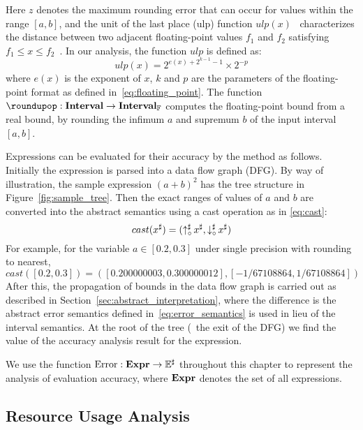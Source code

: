 Here $z$ denotes the maximum rounding error that can occur for values
within the range $[a, b]$, and the unit of the last place (ulp) function
$ulp(x)$~\cite{muller} characterizes the distance between two adjacent
floating-point values $f_1$ and $f_2$ satisfying $f_1 \leq x \leq
f_2$~\cite{goldberg}. In our analysis, the function $ulp$ is defined as:
\begin{equation}
    ulp(x) = 2^{e(x) + 2^{k - 1} - 1} \times 2^{-p}
\end{equation}
where $e(x)$ is the exponent of $x$, $k$ and $p$ are the parameters of the
floating-point format as defined in~\eqref{eq:floating_point}. The function
$\roundupop: \intervalset \to \floatintervalset$ computes the floating-point
bound from a real bound, by rounding the infimum $a$ and supremum $b$ of the
input interval $[a, b]$.

Expressions can be evaluated for their accuracy by the method as follows.
Initially the expression is parsed into a data flow graph (DFG). By way of
illustration, the sample expression ${(a + b)}^2$ has the tree structure
in Figure~\ref{fig:sample_tree}. Then the exact ranges of values of $a$ and
$b$ are converted into the abstract semantics using a cast operation as in
\eqref{eq:cast}:
\begin{equation}
    cast(x^\sharp) = (\operatorname{\uparrow^\sharp_\circ}{x^\sharp}, \operatorname{\downarrow^\sharp_\circ}{x^\sharp})
    \label{eq:cast}
\end{equation}
For example, for the variable $a \in [0.2, 0.3]$ under single precision
with rounding to nearest,
\begin{equation}
    cast([0.2, 0.3]) = ([0.200000003, 0.300000012], [-1/67108864, 1/67108864])
\end{equation}
After this, the propagation of bounds in the data flow graph is carried out as
described in Section~\ref{sec:abstract_interpretation}, where the difference is
the abstract error semantics defined in~\eqref{eq:error_semantics} is used in
lieu of the interval semantics. At the root of the tree (\ie~the exit of the
DFG) we find the value of the accuracy analysis result for the expression.

We use the function $\operatorname{\mathrm{Error}}: \mathbf{Expr}\to\mathbb{E}^\sharp$ throughout this chapter to
represent the analysis of evaluation accuracy, where $\mathbf{Expr}$ denotes the set
of all expressions.

\subsection{Resource Usage Analysis}

